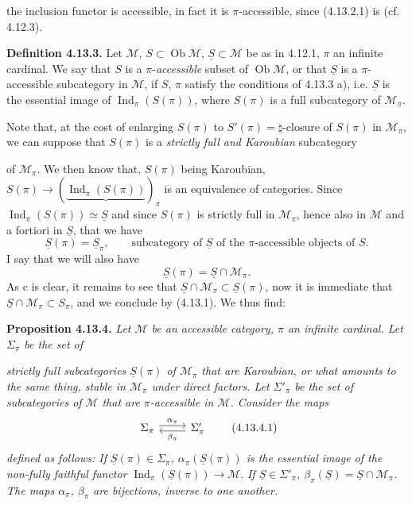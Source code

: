 \documentclass[11pt]{article}
\newcommand{\printedpage}[1]{\marginpar{\footnotesize p.~#1}}
\newcommand{\msp}[1]{\marginpar{\footnotesize [#1]}}
\newcommand{\M}{\mathcal{M}}
\newcommand{\Ind}{\operatorname{Ind}}
\newcommand{\Ob}{\operatorname{Ob}}
\newcommand{\uS}{\underline{S}}
\begin{document}
\msp{page 286}
 the inclusion functor is accessible, in fact it is $\pi$-accessible, since (4.13.2.1) is (cf. 4.12.3).

\textbf{Definition 4.13.3.} Let $\M$, $S \subset \Ob\M$, $\uS \subset \M$ be as in 4.12.1, $\pi$ an infinite cardinal. We say that $S$ is a $\pi$-\textit{accessible} subset of $\Ob\M$, or that $\uS$ is a $\pi$-accessible subcategory in $\M$, if $S$, $\pi$ satisfy the conditions of 4.13.3 a), i.e. $\uS$ is the essential image %
of $\Ind_\pi(S(\pi))$, where $S(\pi)$ is a full subcategory of $\M_\pi$.

Note that, at the cost of enlarging $S(\pi)$ to $S'(\pi) = {\natural}$-closure of $S(\pi)$ in $\M_\pi$, we can suppose that $S(\pi)$ is a \textit{strictly full and Karoubian} subcategory

\msp{page 287}
of $\M_\pi$. We then know that, $S(\pi)$ being Karoubian, $S(\pi) \longrightarrow (\underbrace{\Ind_\pi(S(\pi))}_{})_\pi$ is an equivalence of categories. Since $\Ind_\pi(S(\pi)) \simeq \uS$ and since $S(\pi)$ is strictly full in $\M_\pi$, hence also in $\M$ and a fortiori in $\uS$, that we have
\[
\uS(\pi) = \uS_\pi , \qquad \text{subcategory of } \uS \text{ of the } \pi\text{-accessible objects of } S. \tag*{(4.13.1)}
\]
I say that we will also have
\[
\uS(\pi) = \uS \cap \M_\pi . \tag*{(4.13.2)}
\]
As c is clear, it remains to see that $\uS{\cap}\M_\pi \subset \uS(\pi)$, now it is immediate that $\uS{\cap}\M_\pi \subset S_\pi$, %
and we conclude by (4.13.1). We thus find:

\textbf{Proposition 4.13.4.} \textit{Let $\M$ be an accessible category, $\pi$ an infinite cardinal. Let $\Sigma_\pi$ be the set of}

\msp{page 288}
\textit{strictly full subcategories $\uS(\pi)$ of $\M_\pi$ that are Karoubian, or what amounts to the same thing, stable in $\M_\pi$ under direct factors. Let $\Sigma'_\pi$ be the set of subcategories of}
\printedpage{107}
\textit{$\M$ that are $\pi$-accessible in $\M$. Consider the maps}
\[
\begin{tikzcd}
\Sigma_\pi \arrow[r, shift left, "\alpha_\pi"] & \Sigma'_\pi \arrow[l, shift left, "\beta_\pi"]
\end{tikzcd}
\tag*{(4.13.4.1)}
\]
\textit{defined as follows: If $\uS(\pi) \in \Sigma_\pi$, $\alpha_\pi(\uS(\pi))$ is the essential image of the non-fully faithful functor} $\Ind_\pi(\uS(\pi)) \longrightarrow \M$. \textit{If $\uS \in \Sigma'_\pi$, $\beta_\pi(\uS) = \uS \cap \M_\pi$. The maps $\alpha_\pi$, $\beta_\pi$ are bijections, inverse to one another.}
\end{document}
